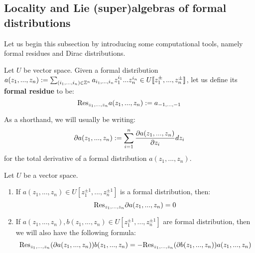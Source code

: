     \subsection{Locality and Lie (super)algebras of formal distributions}
        Let us begin this subsection by introducing some computational tools, namely formal residues and Dirac distributions.
        \begin{definition} \label{def: formal_residues}
            Let $U$ be vector space. Given a formal distribution $a(z_1, ..., z_n) := \sum_{(i_1, ..., i_n) \in \mathbb{Z}^n} a_{i_1, ..., i_n} z_1^{i_1} ... z_n^{i_n} \in U[\![z_1^{\pm}, ..., z_n^{\pm}]\!]$, let us define its \textbf{formal residue} to be:
                $$\mathrm{Res}_{z_1, ..., z_n} a(z_1, ..., z_n) := a_{-1, ..., -1}$$
        \end{definition}
        
        \begin{convention}
            As a shorthand, we will usually be writing:
                $$\partial a(z_1, ..., z_n) := \sum_{i = 1}^n \frac{\partial a(z_1, ..., z_n)}{\partial z_i} dz_i$$
            for the total derivative of a formal distribution $a(z_1, ..., z_n)$.
        \end{convention}
        \begin{lemma} \label{lemma: integration_by_parts}
            Let $U$ be a vector space.
            \begin{enumerate}
                \item If $a(z_1, ..., z_n) \in U[z_1^{\pm 1}, ..., z_n^{\pm 1}]$ is a formal distribution, then:
                    $$\mathrm{Res}_{z_1, ..., z_n} \partial a(z_1, ..., z_n) = 0$$
                \item If $a(z_1, ..., z_n), b(z_1, ..., z_n) \in U[z_1^{\pm 1}, ..., z_n^{\pm 1}]$ are formal distribution, then we will also have the following  formula:
                    $$\mathrm{Res}_{z_1, ..., z_n} (\partial a(z_1, ..., z_n)) b(z_1, ..., z_n) = -\mathrm{Res}_{z_1, ..., z_n} (\partial b(z_1, ..., z_n)) a(z_1, ..., z_n)$$
            \end{enumerate}
        \end{lemma}

